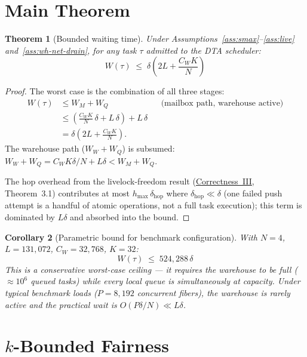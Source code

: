 \documentclass[11pt,a4paper]{article}
\newtheorem{theorem}{Theorem}[section]
\newtheorem{corollary}[theorem]{Corollary}
\begin{document}
\section{Main Theorem}

\begin{theorem}[Bounded waiting time]
\label{thm:bounded-wait}
Under Assumptions~\ref{ass:smax}--\ref{ass:live} and~\ref{ass:wh-net-drain},
for any task $\tau$ admitted to the DTA scheduler:
\[
  \boxed{
    W(\tau) \;\leq\; \delta\!\left(2L + \frac{C_W K}{N}\right)
  }
\]
\end{theorem}

\begin{proof}
The worst case is the combination of all three stages:
\begin{align*}
  W(\tau)
  &\leq W_M + W_Q
  &&\text{(mailbox path, warehouse active)} \\
  &\leq \left(\frac{C_W K}{N}\,\delta + L\,\delta\right) + L\,\delta \\
  &= \delta\!\left(2L + \frac{C_W K}{N}\right).
\end{align*}
The warehouse path ($W_W + W_Q$) is subsumed:
$W_W + W_Q = C_W K\delta/N + L\delta < W_M + W_Q$.

The hop overhead from the livelock-freedom result
(\hyperref[chap:livelock]{Correctness~III}, Theorem~3.1)
contributes at most $h_{\max}\,\delta_{\mathrm{hop}}$ where
$\delta_{\mathrm{hop}} \ll \delta$ (one failed push attempt is a
handful of atomic operations, not a full task execution); this term
is dominated by $L\delta$ and absorbed into the bound.
\end{proof}

\begin{corollary}[Parametric bound for benchmark configuration]
With $N=4$, $L=131{,}072$, $C_W=32{,}768$, $K=32$:
\[
  W(\tau) \;\leq\; 524{,}288\,\delta
\]
This is a \emph{conservative} worst-case ceiling --- it requires the
warehouse to be full ($\approx 10^6$ queued tasks) while every
local queue is simultaneously at capacity.  Under typical benchmark
loads ($P = 8{,}192$ concurrent fibers), the warehouse is rarely
active and the practical wait is $O(P\delta/N) \ll L\delta$.
\end{corollary}

\section{$k$-Bounded Fairness}
\end{document}
